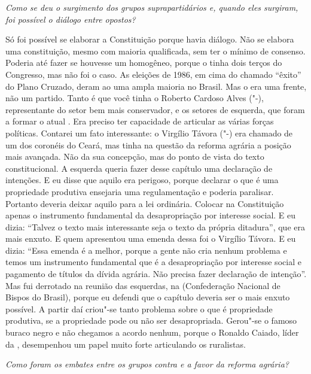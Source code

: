 \noindent\emph{Como se deu o surgimento dos grupos suprapartidários e, quando
eles surgiram, foi possível o diálogo entre opostos?}

Só foi possível se elaborar a Constituição porque havia
diálogo. Não se elabora uma constituição, mesmo com maioria qualificada,
sem ter o mínimo de consenso. Poderia até fazer se houvesse um 
homogêneo, porque o  tinha dois terços do Congresso, mas não foi o
caso. As eleições de 1986, em cima do chamado ``êxito'' do Plano
Cruzado, deram ao  uma ampla maioria no Brasil. Mas o  era uma
frente, não um partido. Tanto é que você tinha o Roberto Cardoso Alves
("-), representante do setor bem mais conservador, e os setores de
esquerda, que foram a formar o atual . Era preciso ter capacidade de
articular as várias forças políticas. Contarei um fato interessante: o
Virgílio Távora ("-) era chamado de um dos coronéis do Ceará, mas
tinha na questão da reforma agrária a posição mais avançada. Não da sua
concepção, mas do ponto de vista do texto constitucional. A esquerda
queria fazer desse capítulo uma declaração de intenções. E eu disse que
aquilo era perigoso, porque declarar o que é uma propriedade produtiva
ensejaria uma regulamentação e poderia paralisar. Portanto deveria
deixar aquilo para a lei ordinária. Colocar na Constituição apenas o
instrumento fundamental da desapropriação por interesse social. E eu
dizia: ``Talvez o texto mais interessante seja o texto da própria
ditadura'', que era mais enxuto. E quem apresentou uma emenda dessa foi
o Virgílio Távora. E eu dizia: ``Essa emenda é a melhor, porque a gente
não cria nenhum problema e temos um instrumento fundamental que é a
desapropriação por interesse social e pagamento de títulos da dívida
agrária. Não precisa fazer declaração de intenção''. Mas fui derrotado
na reunião das esquerdas, na  (Confederação Nacional de Bispos do
Brasil), porque eu defendi que o capítulo deveria ser o mais enxuto
possível. A partir daí criou"-se tanto problema sobre o que é propriedade
produtiva, se a propriedade pode ou não ser desapropriada. Gerou"-se o
famoso buraco negro e não chegamos a acordo nenhum, porque o Ronaldo
Caiado, líder da , desempenhou um papel muito forte articulando os
ruralistas.

\medskip

\noindent\emph{Como foram os embates entre os grupos contra e a favor da
reforma agrária?}

